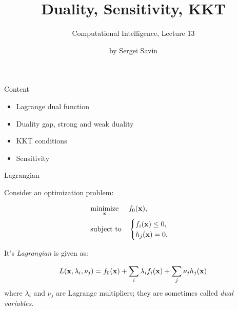 \documentclass{beamer}
\title{Duality, Sensitivity, KKT}
\subtitle{Computational Intelligence, Lecture 13}
\author{by Sergei Savin}
\date{\mydate}
\begin{document}
\maketitle


\begin{frame}{Content}

\begin{itemize}
\item Lagrange dual function
\item Duality gap, strong and weak duality
\item KKT conditions
\item Sensitivity
\end{itemize}

\end{frame}







\begin{frame}{Lagrangian}
	\begin{flushleft}
		
		Consider an optimization problem:
		
		\begin{equation}
			\begin{aligned}
				& \underset{\mathbf{x}}{\text{minimize}}
				& & f_0(\mathbf{x}), \\
				& \text{subject to}
				& & \begin{cases}
					f_i(\mathbf{x}) \leq 0, \\
					h_j(\mathbf{x}) = 0.
				\end{cases}
			\end{aligned}
		\end{equation}
		
		It's \emph{Lagrangian} is given as:
		
		\begin{equation}
			L(\mathbf{x}, \lambda_i, \nu_j) = 
			f_0(\mathbf{x}) + 
			\sum\limits_i \lambda_i f_i(\mathbf{x}) +
			\sum\limits_j \nu_j h_j(\mathbf{x})
		\end{equation}
	where $\lambda_i$ and $\nu_j$ are Lagrange multipliers; they are sometimes called \emph{dual variables}.
		
	\end{flushleft}
\end{frame}
\end{document}
